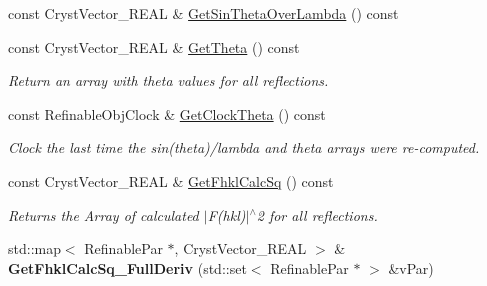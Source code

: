 \begin{DoxyCompactItemize}
const Cryst\+Vector\+\_\+\+R\+E\+AL \& \mbox{\hyperlink{class_obj_cryst_1_1_scattering_data_a27cf813d222bbc0b261f794051125219}{Get\+Sin\+Theta\+Over\+Lambda}} () const
\item 
\mbox{\label{class_obj_cryst_1_1_scattering_data_a4c215cad9905503946a741afe9e9c8ad}} 
const Cryst\+Vector\+\_\+\+R\+E\+AL \& \mbox{\hyperlink{class_obj_cryst_1_1_scattering_data_a4c215cad9905503946a741afe9e9c8ad}{Get\+Theta}} () const
\begin{DoxyCompactList}\small\item\em Return an array with theta values for all reflections. \end{DoxyCompactList}\item 
\mbox{\label{class_obj_cryst_1_1_scattering_data_a7e8045588ffcc88c38f98a6661a57e64}} 
const Refinable\+Obj\+Clock \& \mbox{\hyperlink{class_obj_cryst_1_1_scattering_data_a7e8045588ffcc88c38f98a6661a57e64}{Get\+Clock\+Theta}} () const
\begin{DoxyCompactList}\small\item\em Clock the last time the sin(theta)/lambda and theta arrays were re-\/computed. \end{DoxyCompactList}\item 
\mbox{\label{class_obj_cryst_1_1_scattering_data_a76b2f6c60a87bc63895985eac57b8f0b}} 
const Cryst\+Vector\+\_\+\+R\+E\+AL \& \mbox{\hyperlink{class_obj_cryst_1_1_scattering_data_a76b2f6c60a87bc63895985eac57b8f0b}{Get\+Fhkl\+Calc\+Sq}} () const
\begin{DoxyCompactList}\small\item\em Returns the Array of calculated $\vert$F(hkl)$\vert$$^\wedge$2 for all reflections. \end{DoxyCompactList}\item 
\mbox{\label{class_obj_cryst_1_1_scattering_data_a14c786e7623469cf32bedfd0b1ebb637}} 
std\+::map$<$ Refinable\+Par $\ast$, Cryst\+Vector\+\_\+\+R\+E\+AL $>$ \& {\bfseries Get\+Fhkl\+Calc\+Sq\+\_\+\+Full\+Deriv} (std\+::set$<$ Refinable\+Par $\ast$ $>$ \&v\+Par)
\item 
\mbox{\label{class_obj_cryst_1_1_scattering_data_af95450724f3e42f50cd0fc04cb8e1d2a}} 

\end{DoxyCompactItemize}
